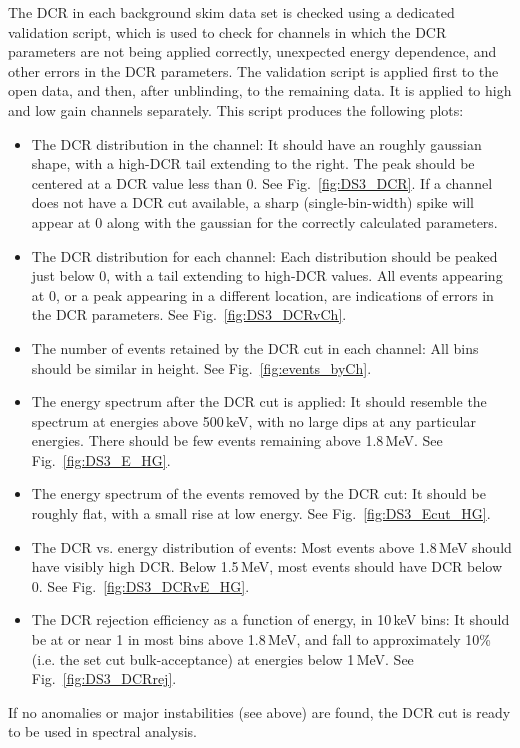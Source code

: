 The DCR in each background skim data set is checked using a dedicated validation script, which is used to check for channels in which the DCR parameters are not being applied correctly, unexpected energy dependence, and other errors in the DCR parameters.  The validation script is applied first to the open data, and then, after unblinding, to the remaining data. It is applied to high and low gain channels separately. This script produces the following plots:
\begin{itemize}
\item The DCR distribution in the channel: It should have an roughly gaussian shape, with a high-DCR tail extending to the right. The peak should be centered at a DCR value less than 0. See Fig.~\ref{fig:DS3_DCR}. If a channel does not have a DCR cut available, a sharp (single-bin-width) spike will appear at 0 along with the gaussian for the correctly calculated parameters. 
\item The DCR distribution for each channel: Each distribution should be peaked just below 0, with a tail extending to high-DCR values. All events appearing at 0, or a peak appearing in a different location, are indications of errors in the DCR parameters. See Fig.~\ref{fig:DS3_DCRvCh}.
\item The number of events retained by the DCR cut in each channel: All bins should be similar in height. See Fig.~\ref{fig:events_byCh}.
\item The energy spectrum after the DCR cut is applied: It should resemble the \twonubb spectrum at energies above 500\,keV, with no large dips at any particular energies. There should be few events remaining above 1.8\,MeV. See Fig.~\ref{fig:DS3_E_HG}.
\item The energy spectrum of the events removed by the DCR cut: It should be roughly flat, with a small rise at low energy. See Fig.~\ref{fig:DS3_Ecut_HG}.
\item The DCR vs. energy distribution of events: Most events above 1.8\,MeV should have visibly high DCR. Below 1.5\,MeV, most events should have DCR below 0. See Fig.~\ref{fig:DS3_DCRvE_HG}.
\item The DCR rejection efficiency as a function of energy, in 10\,keV bins: It should be at or near 1 in most bins above 1.8\,MeV, and fall to approximately 10\% (i.e. the set cut bulk-acceptance) at energies below 1\,MeV. See Fig.~\ref{fig:DS3_DCRrej}.
\end{itemize}

If no anomalies or major instabilities (see above) are found, the DCR cut is ready to be used in spectral analysis. 

